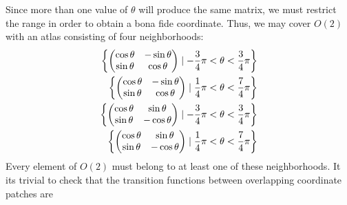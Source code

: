 \documentclass[12pt]{article}
\begin{document}
Since more than one value of $\theta$ will produce the same
matrix, we must restrict the range in order to obtain a 
bona fide coordinate.  Thus, we may cover $O(2)$ with an
atlas consisting of four neighborhoods:
\begin{align*}
\left\{  \begin{pmatrix} \cos \theta & - \sin \theta \\
                 \sin \theta &   \cos \theta
         \end{pmatrix} \mid
         - {3 \over 4} \pi < \theta <  {3 \over 4} \pi
\right\} \\
\left\{  \begin{pmatrix} \cos \theta & - \sin \theta \\
                 \sin \theta &   \cos \theta
         \end{pmatrix} \mid
         {1 \over 4} \pi < \theta <  {7 \over 4} \pi
\right\} \\
\left\{  \begin{pmatrix} \cos \theta &  \sin \theta \\
                 \sin \theta & - \cos \theta
         \end{pmatrix} \mid
         - {3 \over 4} \pi < \theta <  {3 \over 4} \pi
\right\} \\
\left\{  \begin{pmatrix} \cos \theta &  \sin \theta \\
                 \sin \theta & - \cos \theta
         \end{pmatrix} \mid
         {1 \over 4} \pi < \theta <  {7 \over 4} \pi
\right\}
\end{align*}
Every element of $O(2)$ must belong to at least one of
these neighborhoods.  It its trivial to check that the
transition functions between overlapping coordinate
patches are 
\end{document}

